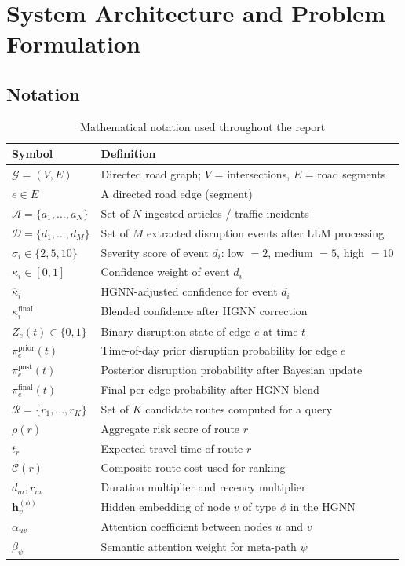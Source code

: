 \chapter{System Architecture and Problem Formulation}

\section{Notation}

\begin{table}[H]
\centering
\caption{Mathematical notation used throughout the report}
\begin{tabular}{p{2.8cm} p{10cm}}
\toprule
\textbf{Symbol} & \textbf{Definition} \\
\midrule
$\mathcal{G} = (V, E)$
  & Directed road graph; $V$ = intersections, $E$ = road segments \\
$e \in E$
  & A directed road edge (segment) \\
$\mathcal{A} = \{a_1, \dots, a_N\}$
  & Set of $N$ ingested articles / traffic incidents \\
$\mathcal{D} = \{d_1, \dots, d_M\}$
  & Set of $M$ extracted disruption events after LLM processing \\
$\sigma_i \in \{2, 5, 10\}$
  & Severity score of event $d_i$: low $= 2$, medium $= 5$, high $= 10$ \\
$\kappa_i \in [0, 1]$
  & Confidence weight of event $d_i$ \\
$\hat{\kappa}_i$
  & HGNN-adjusted confidence for event $d_i$ \\
$\kappa_i^{\text{final}}$
  & Blended confidence after HGNN correction \\
$Z_e(t) \in \{0, 1\}$
  & Binary disruption state of edge $e$ at time $t$ \\
$\pi_e^{\text{prior}}(t)$
  & Time-of-day prior disruption probability for edge $e$ \\
$\pi_e^{\text{post}}(t)$
  & Posterior disruption probability after Bayesian update \\
$\pi_e^{\text{final}}(t)$
  & Final per-edge probability after HGNN blend \\
$\mathcal{R} = \{r_1, \dots, r_K\}$
  & Set of $K$ candidate routes computed for a query \\
$\rho(r)$
  & Aggregate risk score of route $r$ \\
$t_r$
  & Expected travel time of route $r$ \\
$\mathcal{C}(r)$
  & Composite route cost used for ranking \\
$d_m, r_m$
  & Duration multiplier and recency multiplier \\
$\mathbf{h}_v^{(\phi)}$
  & Hidden embedding of node $v$ of type $\phi$ in the HGNN \\
$\alpha_{uv}$
  & Attention coefficient between nodes $u$ and $v$ \\
$\beta_\psi$
  & Semantic attention weight for meta-path $\psi$ \\
\bottomrule
\end{tabular}
\end{table}

